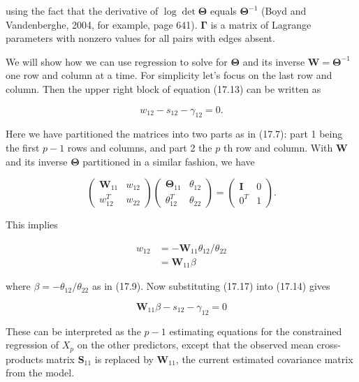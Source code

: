 \documentclass[10pt]{article}
\begin{document}
using the fact that the derivative of $\log \operatorname{det} \boldsymbol{\Theta}$ equals $\boldsymbol{\Theta}^{-1}$ (Boyd and Vandenberghe, 2004, for example, page 641). $\boldsymbol{\Gamma}$ is a matrix of Lagrange parameters with nonzero values for all pairs with edges absent.

We will show how we can use regression to solve for $\boldsymbol{\Theta}$ and its inverse $\mathbf{W}=\boldsymbol{\Theta}^{-1}$ one row and column at a time. For simplicity let's focus on the last row and column. Then the upper right block of equation (17.13) can be written as


\begin{equation*}
w_{12}-s_{12}-\gamma_{12}=0 . \tag{17.14}
\end{equation*}


Here we have partitioned the matrices into two parts as in (17.7): part 1 being the first $p-1$ rows and columns, and part 2 the $p$ th row and column. With $\mathbf{W}$ and its inverse $\boldsymbol{\Theta}$ partitioned in a similar fashion, we have

\[
\left(\begin{array}{ll}
\mathbf{W}_{11} & w_{12}  \tag{17.15}\\
w_{12}^{T} & w_{22}
\end{array}\right)\left(\begin{array}{ll}
\boldsymbol{\Theta}_{11} & \theta_{12} \\
\theta_{12}^{T} & \theta_{22}
\end{array}\right)=\left(\begin{array}{cc}
\mathbf{I} & 0 \\
0^{T} & 1
\end{array}\right) .
\]

This implies


\begin{align*}
w_{12} & =-\mathbf{W}_{11} \theta_{12} / \theta_{22}  \tag{17.16}\\
& =\mathbf{W}_{11} \beta \tag{17.17}
\end{align*}


where $\beta=-\theta_{12} / \theta_{22}$ as in (17.9). Now substituting (17.17) into (17.14) gives


\begin{equation*}
\mathbf{W}_{11} \beta-s_{12}-\gamma_{12}=0 \tag{17.18}
\end{equation*}


These can be interpreted as the $p-1$ estimating equations for the constrained regression of $X_{p}$ on the other predictors, except that the observed mean cross-products matrix $\mathbf{S}_{11}$ is replaced by $\mathbf{W}_{11}$, the current estimated covariance matrix from the model.
\end{document}
